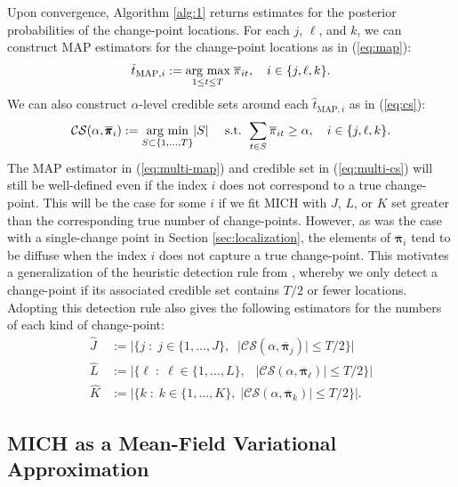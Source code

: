 

Upon convergence, Algorithm \ref{alg:1} returns estimates for the posterior probabilities of the change-point locations. For each $j$, $\ell$, and $k$, we can construct MAP estimators for the change-point locations as in (\ref{eq:map}):
\begin{align}\label{eq:multi-map}
    \hat{t}_{\text{MAP}, i} := \underset{1 \leq t \leq T}{\text{arg max}} \; \overline{\pi}_{it}, \quad i \in \{j, \ell, k\}.
\end{align}
We can also construct $\alpha$-level credible sets around each $\hat{t}_{\text{MAP}, i}$ as in (\ref{eq:cs}):
\begin{align}\label{eq:multi-cs}
    \mathcal{CS}(\alpha, \overline{\pmb{\pi}}_i) := \underset{S \subset \{1,\ldots,T\}}{\text{arg min}} |S| \quad\text{ s.t. } \sum_{t \in S} \overline{\pi}_{it} \geq \alpha, \quad i \in \{j, \ell, k\}.
\end{align}
The MAP estimator in (\ref{eq:multi-map}) and credible set in (\ref{eq:multi-cs}) will still be well-defined even if the index $i$ does not correspond to a true change-point. This will be the case for some $i$ if we fit MICH with $J$, $L$, or $K$ set greater than the corresponding true number of change-points. However, as was the case with a single-change point in Section \ref{sec:localization}, the elements of $\overline{\pmb{\pi}}_i$ tend to be diffuse when the index $i$ does not capture a true change-point. This motivates a generalization  of the heuristic detection rule from \cite{Cappello22}, whereby we only detect a change-point if its associated credible set contains $T/2$ or fewer locations. Adopting this detection rule also gives the following estimators for the numbers of each kind of change-point:
\begin{align}
    \hat{J} &:= |\{j \;:\; j \in \{1,\ldots,J\}, \;\;|\mathcal{CS}(\alpha, \overline{\pmb{\pi}}_j)| \leq T/2\}| \label{eq:J-estimator}\\
    \hat{L} &:= |\{\ell \;:\; \ell \in \{1,\ldots,L\},\;\;\: |\mathcal{CS}(\alpha, \overline{\pmb{\pi}}_\ell)| \leq T/2\}| \label{eq:L-estimator}\\
    \hat{K} &:= |\{k \;:\; k \in \{1,\ldots,K\},\; |\mathcal{CS}(\alpha, \overline{\pmb{\pi}}_k)| \leq T/2\}|. \label{eq:K-estimator}
\end{align}

\subsection{MICH as a Mean-Field Variational Approximation}
\label{sec:variational-bayes}

